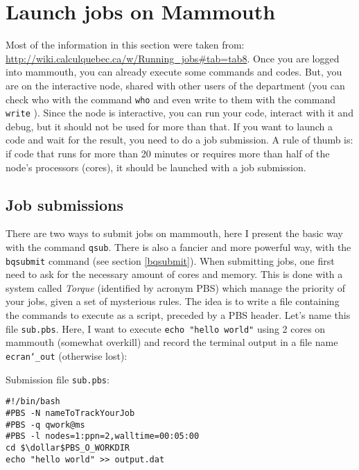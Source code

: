 \documentclass[10pt,letter]{article}
\newcommand{\dollar}{\mbox{\textdollar}}
\begin{document}
\section{Launch jobs on Mammouth}

Most of the information in this section were taken from:
\url{http://wiki.calculquebec.ca/w/Running_jobs#tab=tab8}.
Once you are logged into mammouth, you can already execute some commands and codes.
But, you are on the interactive node, shared with other users of the department
(you can check who with the command \texttt{who} and even write to them with the command \texttt{write} ).
Since the node is interactive, you can run your code, interact with it and debug, 
but it should not be used for more than that.
If you want to launch a code and wait for the result, you need to do a job submission.
A rule of thumb is: if code that runs for more than 20 minutes or requires more than half of the node's 
processors (cores), it should be launched with a job submission.

\subsection{Job submissions}

There are two ways to submit jobs on mammouth, here I present the basic way with the command \texttt{qsub}. 
There is also a fancier and more powerful way, with the \texttt{bqsubmit}  command (see section \ref{bqsubmit}). 
When submitting jobs, one first need to ask for the necessary amount of cores and memory. 
This is done with a system called \emph{Torque} (identified by acronym PBS) which manage the priority of your jobs, 
given a set of mysterious rules.
The idea is to write a file containing the commands to execute as a script, preceded by a PBS header. 
Let's name this file \texttt{sub.pbs}. 
Here, I want to execute \texttt{echo "hello world"}  using 2 cores on mammouth (somewhat overkill) 
and record the terminal output in a file name \texttt{ecran\char`_out}  (otherwise lost):

Submission file \texttt{sub.pbs}:

\begin{bashInput}[backgroundcolor=myblue]
\begin{lstlisting}[style=FileInputStyle]
#!/bin/bash
#PBS -N nameToTrackYourJob
#PBS -q qwork@ms
#PBS -l nodes=1:ppn=2,walltime=00:05:00
cd $\dollar$PBS_O_WORKDIR
echo "hello world" >> output.dat
\end{lstlisting}
\end{bashInput}
\end{document}
